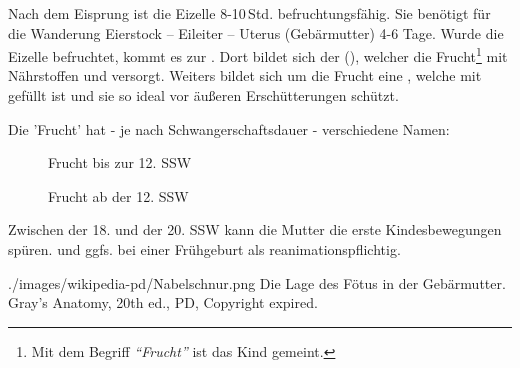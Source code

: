 {
Nach dem Eisprung ist die Eizelle 8-10\,Std.
befruchtungsfähig. Sie benötigt für die Wanderung Eierstock -- Eileiter --
Uterus (Gebärmutter) 4-6 Tage. Wurde die Eizelle befruchtet, kommt es zur
. Dort bildet
sich der  (), welcher die
Frucht\footnote{Mit dem Begriff \emph{"`Frucht"'} ist das
Kind gemeint.} mit Nährstoffen und  versorgt. Weiters
bildet sich um die Frucht eine , welche mit  gefüllt ist und sie so ideal vor äußeren
Erschütterungen schützt.

Die 'Frucht' hat - je nach Schwangerschaftsdauer - verschiedene Namen:


\begin{description}
    \item[] Frucht bis zur 12. SSW
    \item[] Frucht ab der 12. SSW
\end{description}

Zwischen der 18. und der 20. SSW kann die Mutter die erste
Kindesbewegungen spüren.  und ggfs. bei einer
Frühgeburt als reanimationspflichtig.
}{}
{./images/wikipedia-pd/Nabelschnur.png}
{Die Lage des Fötus in der Gebärmutter.}
{Gray's Anatomy, 20th ed., PD, Copyright expired.}




